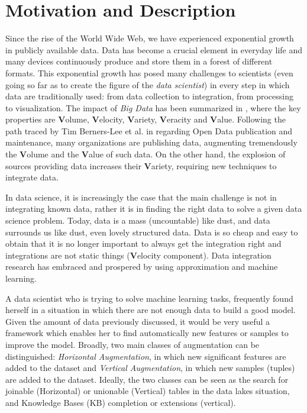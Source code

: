 \section{Motivation and Description}\label{motivations}

Since the rise of the World Wide Web, we have experienced exponential growth in publicly available data. Data has become a crucial element in everyday life and many devices continuously produce and store them in a forest of different formats. This exponential growth has posed many challenges to scientists (even going so far as to create the figure of the \textit{data scientist}) in every step in which data are traditionally used: from data collection to integration, from processing to visualization. The impact of \textit{Big Data} has been summarized in \cite{mcafee2012big}, where the key properties are \textbf{V}olume, \textbf{V}elocity, \textbf{V}ariety, \textbf{V}eracity and \textbf{V}alue. Following the path traced by Tim Berners-Lee et al. in \cite{bizer2009linked} regarding Open Data publication and maintenance, many organizations are publishing data, augmenting tremendously the \textbf{V}olume and the \textbf{V}alue of such data. On the other hand, the explosion of sources providing data increases their \textbf{V}ariety, requiring new techniques to integrate data.

In data science, it is increasingly the case that the main challenge is not in integrating known data, rather it is in finding the right data to solve a given data science problem. Today, data is a mass (uncountable) like dust, and data surrounds us like dust, even lovely structured data. Data is so cheap and easy to obtain that it is no longer important to always get the integration right and integrations are not static things (\textbf{V}elocity component). Data integration research has embraced and prospered by using approximation and machine learning. 

A data scientist who is trying to solve machine learning tasks, frequently found herself in a situation in which there are not enough data to build a good model. Given the amount of data previously discussed, it would be very useful a framework which enables her to find automatically new features or samples to improve the model. Broadly, two main classes of augmentation can be distinguished: \textit{Horizontal Augmentation}, in which new significant features are added to the dataset and \textit{Vertical Augmentation}, in which new samples (tuples) are added to the dataset. Ideally, the two classes can be seen as the search for joinable (Horizontal) or unionable (Vertical) tables in the data lakes situation, and Knowledge Bases (KB) completion or extensions (vertical).

